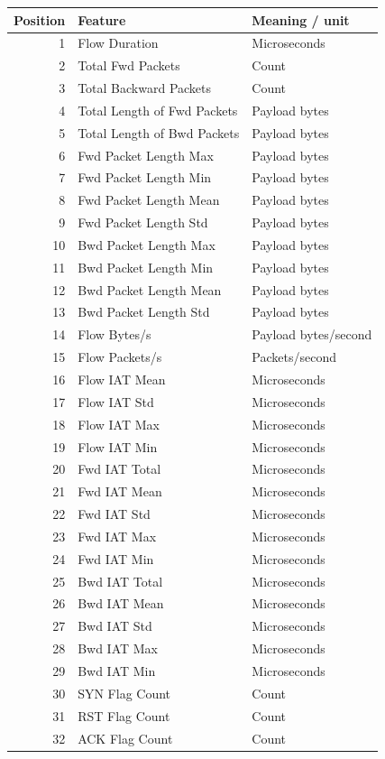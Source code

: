 \documentclass[11pt,a4paper,oneside]{report}
\begin{document}
{\small
\begin{longtable}{@{}rp{}p{}@{}}
\toprule
Position & Feature & Meaning / unit\\\midrule\endhead
1 & Flow Duration & Microseconds\\
2 & Total Fwd Packets & Count\\
3 & Total Backward Packets & Count\\
4 & Total Length of Fwd Packets & Payload bytes\\
5 & Total Length of Bwd Packets & Payload bytes\\
6 & Fwd Packet Length Max & Payload bytes\\
7 & Fwd Packet Length Min & Payload bytes\\
8 & Fwd Packet Length Mean & Payload bytes\\
9 & Fwd Packet Length Std & Payload bytes\\
10 & Bwd Packet Length Max & Payload bytes\\
11 & Bwd Packet Length Min & Payload bytes\\
12 & Bwd Packet Length Mean & Payload bytes\\
13 & Bwd Packet Length Std & Payload bytes\\
14 & Flow Bytes/s & Payload bytes/second\\
15 & Flow Packets/s & Packets/second\\
16 & Flow IAT Mean & Microseconds\\
17 & Flow IAT Std & Microseconds\\
18 & Flow IAT Max & Microseconds\\
19 & Flow IAT Min & Microseconds\\
20 & Fwd IAT Total & Microseconds\\
21 & Fwd IAT Mean & Microseconds\\
22 & Fwd IAT Std & Microseconds\\
23 & Fwd IAT Max & Microseconds\\
24 & Fwd IAT Min & Microseconds\\
25 & Bwd IAT Total & Microseconds\\
26 & Bwd IAT Mean & Microseconds\\
27 & Bwd IAT Std & Microseconds\\
28 & Bwd IAT Max & Microseconds\\
29 & Bwd IAT Min & Microseconds\\
30 & SYN Flag Count & Count\\
31 & RST Flag Count & Count\\
32 & ACK Flag Count & Count\\
\bottomrule\end{longtable}
}
\end{document}
